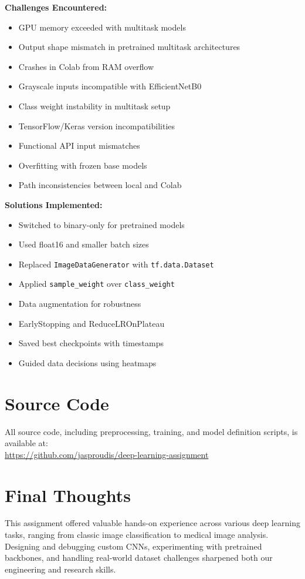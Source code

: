 \documentclass[11pt]{article}
\begin{document}
\textbf{Challenges Encountered:}
\begin{itemize}
    \item GPU memory exceeded with multitask models
    \item Output shape mismatch in pretrained multitask architectures
    \item Crashes in Colab from RAM overflow
    \item Grayscale inputs incompatible with EfficientNetB0
    \item Class weight instability in multitask setup
    \item TensorFlow/Keras version incompatibilities
    \item Functional API input mismatches
    \item Overfitting with frozen base models
    \item Path inconsistencies between local and Colab
\end{itemize}

\textbf{Solutions Implemented:}
\begin{itemize}
    \item Switched to binary-only for pretrained models
    \item Used float16 and smaller batch sizes
    \item Replaced \texttt{ImageDataGenerator} with \texttt{tf.data.Dataset}
    \item Applied \texttt{sample\_weight} over \texttt{class\_weight}
    \item Data augmentation for robustness
    \item EarlyStopping and ReduceLROnPlateau
    \item Saved best checkpoints with timestamps
    \item Guided data decisions using heatmaps
\end{itemize}

\section*{Source Code}
All source code, including preprocessing, training, and model definition scripts, is available at: \\
\url{https://github.com/jasproudis/deep-learning-assignment}

\section*{Final Thoughts}
This assignment offered valuable hands-on experience across various deep learning tasks, ranging from classic image classification to medical image analysis. Designing and debugging custom CNNs, experimenting with pretrained backbones, and handling real-world dataset challenges sharpened both our engineering and research skills.
\end{document}
